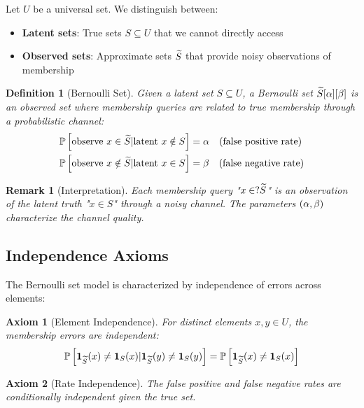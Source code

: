 \documentclass[11pt,final,hidelinks]{article}
\newtheorem{definition}[theorem]{Definition}
\newtheorem{remark}[theorem]{Remark}
\newtheorem{axiom}{Axiom}
\begin{document}
Let $U$ be a universal set. We distinguish between:
\begin{itemize}
    \item \textbf{Latent sets}: True sets $S \subseteq U$ that we cannot directly access
    \item \textbf{Observed sets}: Approximate sets $\widetilde{S}$ that provide noisy observations of membership
\end{itemize}

\begin{definition}[Bernoulli Set]
Given a latent set $S \subseteq U$, a Bernoulli set $\widetilde{S}[\alpha][\beta]$ is an observed set where membership queries are related to true membership through a probabilistic channel:
\begin{align}
\mathbb{P}\left[\text{observe } x \in \widetilde{S} | \text{latent } x \notin S\right] &= \alpha \quad \text{(false positive rate)} \\
\mathbb{P}\left[\text{observe } x \notin \widetilde{S} | \text{latent } x \in S\right] &= \beta \quad \text{(false negative rate)}
\end{align}
\end{definition}

\begin{remark}[Interpretation]
Each membership query "$x \in? \widetilde{S}$" is an observation of the latent truth "$x \in S$" through a noisy channel. The parameters $(\alpha, \beta)$ characterize the channel quality.
\end{remark}

\subsection{Independence Axioms}

The Bernoulli set model is characterized by independence of errors across elements:

\begin{axiom}[Element Independence]
For distinct elements $x, y \in U$, the membership errors are independent:
\begin{equation}
\mathbb{P}\left[\mathbf{1}_{\widetilde{S}}(x) \neq \mathbf{1}_{S}(x) | \mathbf{1}_{\widetilde{S}}(y) \neq \mathbf{1}_{S}(y)\right] = 
\mathbb{P}\left[\mathbf{1}_{\widetilde{S}}(x) \neq \mathbf{1}_{S}(x)\right]
\end{equation}
\end{axiom}

\begin{axiom}[Rate Independence]
The false positive and false negative rates are conditionally independent given the true set.
\end{axiom}
\end{document}
